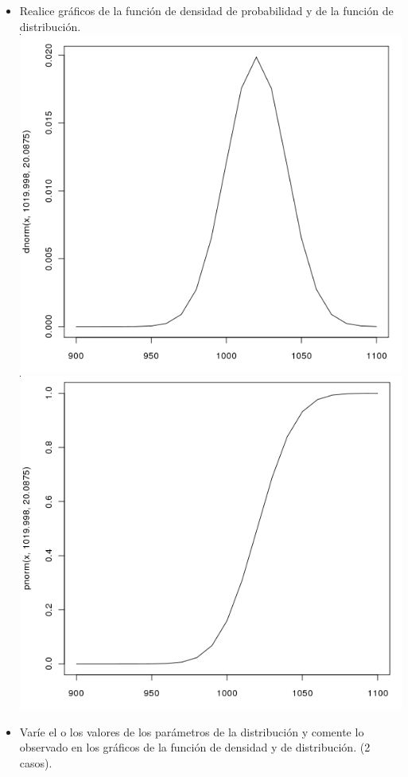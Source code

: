 \begin{itemize}
	\item Realice gr\'aficos de la funci\'on de densidad de probabilidad y de la funci\'on de distribuci\'on.
	\includegraphics[scale=0.5]{images/2_2-dnorm}\\	%
	\includegraphics[scale=0.5]{images/2_2-pnorm}	%
	\item Var\'ie el o los valores de los par\'ametros de la distribuci\'on y comente lo observado en los gr\'aficos de la funci\'on de densidad y de distribuci\'on. (2 casos).


\end{itemize}
